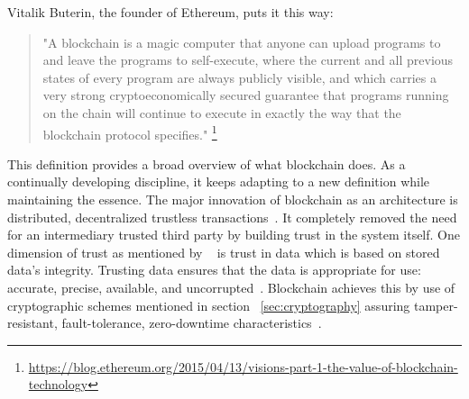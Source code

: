 Vitalik Buterin, the founder of Ethereum, puts it this way:  
\begin{quote}
	\centering
	"A blockchain is a magic computer that anyone can upload programs to and
	leave the programs to self-execute, where the current and all previous
	states of every program are always publicly visible, and which carries a
	very strong cryptoeconomically secured guarantee that programs running on
	the chain will continue to execute in exactly the way that the blockchain
	protocol specifies."
	\footnote{\url{https://blog.ethereum.org/2015/04/13/visions-part-1-the-value-of-blockchain-technology}} 
\end{quote}
This definition provides a broad overview of what blockchain does. As a
continually developing discipline, it keeps adapting to a new definition while
maintaining the essence. The major innovation of blockchain as an architecture
is distributed, decentralized trustless transactions~\cite{Bitcoin_Satoshi}. It
completely removed the need for an intermediary trusted third party by building
trust in the system itself. One dimension of trust as mentioned by
~\cite{miller2010trust} is trust in data which is based on stored data's
integrity. Trusting data ensures that the data is appropriate for use:
accurate, precise, available, and uncorrupted~\cite{miller2010trust}.
Blockchain achieves this by use of cryptographic schemes 
mentioned in section ~\ref{sec:cryptography} assuring tamper-resistant,
fault-tolerance, zero-downtime characteristics~\cite{swan2015blockchain}. 
\newpage

 
